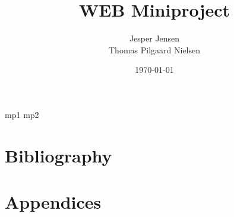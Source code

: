 \documentclass[twoside]{report}
\begin{document}
\pagestyle{empty} %
%
%
%
%

\title{WEB Miniproject}
\date{\today}
\author{Jesper Jensen \\ Thomas Pilgaard Nielsen}

\maketitle



{mp1}
{mp2}





\begingroup
	\part{Bibliography}
	
	\renewcommand{\addcontentsline}[3]{}%
	\renewcommand{\section}[2]{}%
	\renewcommand{\chapter}[2]{}%
	
	\label{biblo:mybiblio}
\endgroup

\appendix
	\part{Appendices}

\end{document}

